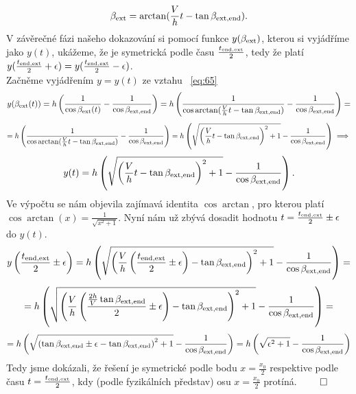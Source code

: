 \documentclass[reqno, a4paper]{amsart}
\begin{document}
\begin{equation}
	\label{eq:78}
	\beta_{\mathrm{ext}}=\arctan(\frac{V}{h}t - \tan \beta_{\mathrm{ext}, \mathrm{end}}).
\end{equation}
V závěrečné fázi našeho dokazování si pomocí funkce $y(\beta_{\mathrm{ext}})$, kterou si vyjádříme jako $y(t)$, ukážeme, že je symetrická podle času $\frac{t_{\mathrm{end}, \mathrm{ext}}}{2}$, tedy že platí $y(\frac{t_{\mathrm{end}, \mathrm{ext}}}{2}+\epsilon)=y(\frac{t_{\mathrm{end}, \mathrm{ext}}}{2}-\epsilon)$.\\
Začněme vyjádřením $y=y(t)$ ze vztahu ~\eqref{eq:65}
\begin{equation}
	\label{eq:79}
	y(\beta_{\mathrm{ext}}(t))=h
	\left(
	\frac{1}{\cos \beta_{\mathrm{ext}}(t)}
	-
	\frac{1}{\cos \beta_{\mathrm{ext}, \mathrm{end}}}
	\right)=h
	\left(
	\frac{1}{\cos \arctan(\frac{V}{h}t - \tan \beta_{\mathrm{ext}, \mathrm{end}})}
	-
	\frac{1}{\cos \beta_{\mathrm{ext}, \mathrm{end}}}
	\right)=
\end{equation}
\begin{equation*}
	=h
	\left(
	\frac{1}{\cos \arctan(\frac{V}{h}t - \tan \beta_{\mathrm{ext}, \mathrm{end}})}
	-
	\frac{1}{\cos \beta_{\mathrm{ext}, \mathrm{end}}}
	\right)=h\left(
	\sqrt{\left( \frac{V}{h}t-\tan \beta_{\mathrm{ext}, \mathrm{end}}\right)^2 + 1 }
	-
	\frac{1}{\cos \beta_{\mathrm{ext}, \mathrm{end}}}
	\right) \implies
\end{equation*}
\begin{equation}
	\label{eq:80}
	y(t)=h\left(
	\sqrt{\left( \frac{V}{h}t-\tan \beta_{\mathrm{ext}, \mathrm{end}}\right)^2 + 1 }
	-
	\frac{1}{\cos \beta_{\mathrm{ext}, \mathrm{end}}}
	\right).
\end{equation}
Ve výpočtu se nám objevila zajímavá identita $\cos \arctan$, pro kterou platí $\cos \arctan (x)=\frac{1}{\sqrt{x^2+1}}$. Nyní nám už zbývá dosadit hodnotu $t = \frac{ t_{\mathrm{end}, \mathrm{ext}}}{2}\pm\epsilon$ do $y(t)$.
\begin{equation*}
	y\left( \frac{ t_{\mathrm{end}, \mathrm{ext}}}{2}\pm\epsilon\right) =h\left(
	\sqrt{\left( \frac{V}{h}\left( \frac{ t_{\mathrm{end}, \mathrm{ext}}}{2}\pm\epsilon\right) -\tan \beta_{\mathrm{ext}, \mathrm{end}}\right)^2 + 1 }
	-
	\frac{1}{\cos \beta_{\mathrm{ext}, \mathrm{end}}}
	\right)=
\end{equation*}
\begin{equation*}
	=h\left(
	\sqrt{\left( \frac{V}{h}\left( \frac{\frac{2h}{V}\tan\beta_{\mathrm{ext}, \mathrm{end}}}{2}\pm\epsilon\right) -\tan \beta_{\mathrm{ext}, \mathrm{end}}\right)^2 + 1 }
	-
	\frac{1}{\cos \beta_{\mathrm{ext}, \mathrm{end}}}
	\right)=
\end{equation*}
\begin{equation}
	\label{eq:80}
	=h\left(
	\sqrt{\left( \tan \beta_{\mathrm{ext}, \mathrm{end}}\pm\epsilon -\tan \beta_{\mathrm{ext}, \mathrm{end}}\right)^2 + 1 }
	-
	\frac{1}{\cos \beta_{\mathrm{ext}, \mathrm{end}}}
	\right)=h\left(\sqrt{\epsilon^2+1}-\frac{1}{\cos \beta_{\mathrm{ext}, \mathrm{end}}}
	\right)
\end{equation}
Tedy jsme dokázali, že řešení je symetrické podle bodu $x=\frac{x_0}{2}$ respektive podle času $t = \frac{ t_{\mathrm{end}, \mathrm{ext}}}{2}$, kdy (podle fyzikálních představ) osu $x=\frac{x_0}{2}$ protíná. $\qed$
\end{document}
